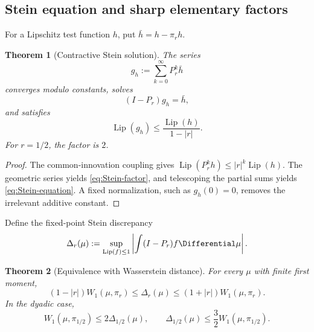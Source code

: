 \documentclass[11pt,a4paper]{article}
\newtheorem{theorem}{Theorem}[section]
\theoremstyle{definition}
\theoremstyle{remark}
\newcommand{\Lip}{\operatorname{Lip}}
\begin{document}
\subsection{Stein equation and sharp elementary factors}

For a Lipschitz test function $h$, put $\bar h=h-\pi_rh$.

\begin{theorem}[Contractive Stein solution]
\label{thm:Stein-solution}
The series
\begin{equation}
 g_h:=\sum_{k=0}^{\infty}P_r^k\bar h
 \label{eq:Stein-series}
\end{equation}
converges modulo constants, solves
\begin{equation}
 (I-P_r)g_h=\bar h,
 \label{eq:Stein-equation}
\end{equation}
and satisfies
\begin{equation}
 \Lip(g_h)\le\frac{\Lip(h)}{1-|r|}.
 \label{eq:Stein-factor}
\end{equation}
For $r=1/2$, the factor is $2$.
\end{theorem}

\begin{proof}
The common-innovation coupling gives $\Lip(P_r^kh)\le|r|^k\Lip(h)$. The geometric series yields \eqref{eq:Stein-factor}, and telescoping the partial sums yields \eqref{eq:Stein-equation}. A fixed normalization, such as $g_h(0)=0$, removes the irrelevant additive constant.
\end{proof}

Define the fixed-point Stein discrepancy
\begin{equation}
 \Delta_r(\mu):=
 \sup_{\Lip(f)\le1}\left|\int(I-P_r)f\Differential\mu\right|.
 \label{eq:Stein-discrepancy}
\end{equation}

\begin{theorem}[Equivalence with Wasserstein distance]
\label{thm:discrepancy-W1}
For every $\mu$ with finite first moment,
\begin{equation}
 \boxed{\displaystyle
 (1-|r|)W_1(\mu,\pi_r)
 \le\Delta_r(\mu)
 \le(1+|r|)W_1(\mu,\pi_r).}
 \label{eq:W1-equivalence}
\end{equation}
In the dyadic case,
\begin{equation}
 W_1(\mu,\pi_{1/2})\le2\Delta_{1/2}(\mu),
 \qquad
 \Delta_{1/2}(\mu)\le\frac32W_1(\mu,\pi_{1/2}).
 \label{eq:dyadic-W1-equivalence}
\end{equation}
\end{theorem}
\end{document}
